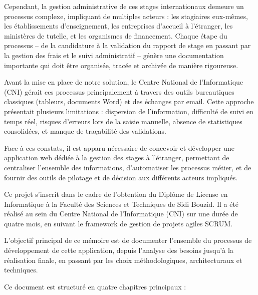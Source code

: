 \documentclass[12pt,a4paper]{report}
\begin{document}
Cependant, la gestion administrative de ces stages internationaux demeure un processus complexe, impliquant de multiples acteurs : les stagiaires eux-mêmes, les établissements d'enseignement, les entreprises d'accueil à l'étranger, les ministères de tutelle, et les organismes de financement. Chaque étape du processus -- de la candidature à la validation du rapport de stage en passant par la gestion des frais et le suivi administratif -- génère une documentation importante qui doit être organisée, tracée et archivée de manière rigoureuse.

Avant la mise en place de notre solution, le Centre National de l'Informatique (CNI) gérait ces processus principalement à travers des outils bureautiques classiques (tableurs, documents Word) et des échanges par email. Cette approche présentait plusieurs limitations : dispersion de l'information, difficulté de suivi en temps réel, risques d'erreurs lors de la saisie manuelle, absence de statistiques consolidées, et manque de traçabilité des validations.

Face à ces constats, il est apparu nécessaire de concevoir et développer une application web dédiée à la gestion des stages à l'étranger, permettant de centraliser l'ensemble des informations, d'automatiser les processus métier, et de fournir des outils de pilotage et de décision aux différents acteurs impliqués.

Ce projet s'inscrit dans le cadre de l'obtention du Diplôme de License en Informatique à la Faculté des Sciences et Techniques de Sidi Bouzid. Il a été réalisé au sein du Centre National de l'Informatique (CNI) sur une durée de quatre mois, en suivant le framework de gestion de projets agiles SCRUM.

L'objectif principal de ce mémoire est de documenter l'ensemble du processus de développement de cette application, depuis l'analyse des besoins jusqu'à la réalisation finale, en passant par les choix méthodologiques, architecturaux et techniques.

Ce document est structuré en quatre chapitres principaux :
\end{document}
